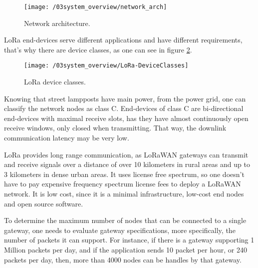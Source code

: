 \begin{figure}[ht]
	\centering
	\texttt{[image: /03system\_overview/network\_arch]}
	\caption{Network architecture.}
	\label{fig:network_arch}
\end{figure}
\clearpage

LoRa end-devices serve different applications and have different requirements, that's why there are device classes, as one can see in figure \ref{fig:lora_device_classes}.

\begin{figure}[ht]
	\centering
	\texttt{[image: /03system\_overview/LoRa-DeviceClasses]}
	\caption{LoRa device classes.}
	\label{fig:lora_device_classes}
\end{figure}

Knowing that street lampposts have main power, from the power grid, one can classify the network nodes as class C. End-devices of class C are bi-directional end-devices with maximal receive slots, has they have almost continuously open receive windows, only closed when transmitting. That way, the downlink communication latency may be very low. \cite{what_is_lorawan}

LoRa provides long range communication, as LoRaWAN gateways can transmit and receive signals over a distance of over 10 kilometers in rural areas and up to 3 kilometers in dense urban areas. It uses license free spectrum, so one doesn't have to pay expensive frequency spectrum license fees to deploy a LoRaWAN network. It is low cost, since it is a minimal infrastructure, low-cost end nodes and open source software. 

To determine the maximum number of nodes that can be connected to a single gateway, one needs to evaluate gateway specifications, more specifically, the number of packets it can support. For instance, if there is a gateway supporting 1 Million packets per day, and if the application sends 10 packet per hour, or 240 packets per day, then, more than 4000 nodes can be handles by that gateway.




